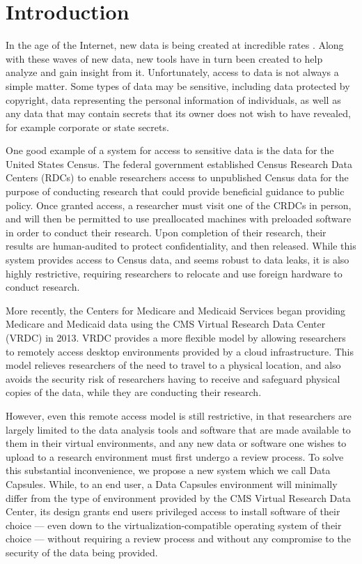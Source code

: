 \documentclass{acm_proc_article-sp}
\begin{document}

\section{Introduction}

In the age of the Internet, new data is being created at incredible rates
\cite{digital-universe}.  Along with these waves of new data, new tools have
in turn been created to help analyze and gain insight from it. Unfortunately,
access to data is not always a simple matter.  Some types of data may be
sensitive, including data protected by copyright, data representing the personal
information of individuals, as well as any data that may contain secrets that
its owner does not wish to have revealed, for example corporate or state secrets.

One good example of a system for access to sensitive data is the data for the
United States Census.  The federal government established Census Research Data
Centers (RDCs) to enable researchers access to unpublished Census data for the
purpose of conducting research that could provide beneficial guidance to public
policy.  Once granted access, a researcher must visit one of the CRDCs in
person, and will then be permitted to use preallocated machines with preloaded
software in order to conduct their research.  Upon completion of their research,
their results are human-audited to protect confidentiality, and then released.
While this system provides access to Census data, and seems robust to data
leaks, it is also highly restrictive, requiring researchers to relocate and use
foreign hardware to conduct research.

More recently, the Centers for Medicare and Medicaid Services began providing
Medicare and Medicaid data using the CMS Virtual Research Data Center (VRDC) in
2013.  VRDC provides a more flexible model by allowing researchers to remotely
access desktop environments provided by a cloud infrastructure.  This model
relieves researchers of the need to travel to a physical location, and also
avoids the security risk of researchers having to receive and safeguard physical
copies of the data, while they are conducting their research.

However, even this remote access model is still restrictive, in that researchers
are largely limited to the data analysis tools and software that are made
available to them in their virtual environments, and any new data or software
one wishes to upload to a research environment must first undergo a review
process. To solve this substantial inconvenience, we propose a new system which
we call Data Capsules.  While, to an end user, a Data Capsules environment will
minimally differ from the type of environment provided by the CMS Virtual
Research Data Center, its design grants end users privileged access to install
software of their choice --- even down to the virtualization-compatible
operating system of their choice --- without requiring a review process and
without any compromise to the security of the data being provided.
\end{document}
